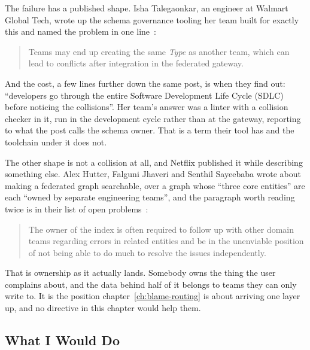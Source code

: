 %
The failure has a published shape. Isha Talegaonkar, an engineer at Walmart
Global Tech, wrote up the schema governance tooling her team built for exactly
this and named the problem in one line~\autocite{talegaonkar2022governance}:

\begin{quote}
Teams may end up creating the same \emph{Type} as another team, which can lead
to conflicts after integration in the federated gateway.
\end{quote}

%
And the cost, a few lines further down the same post, is when they find out:
\enquote{developers go through the entire Software Development Life Cycle
(SDLC) before noticing the collisions}. Her team's answer was a linter with a
collision checker in it, run in the development cycle rather than at the
gateway, reporting to what the post calls the schema owner. That is a term
their tool has and the toolchain under it does not.

%
The other shape is not a collision at all, and Netflix published it while
describing something else. Alex Hutter, Falguni Jhaveri and Senthil Sayeebaba
wrote about making a federated graph searchable, over a graph whose \enquote{three
core entities} are each \enquote{owned by separate engineering teams}, and the
paragraph worth reading twice is in their list of open
problems~\autocite{hutter2022search}:

\begin{quote}
The owner of the index is often required to follow up with other domain teams
regarding errors in related entities and be in the unenviable position of not
being able to do much to resolve the issues independently.
\end{quote}

%
That is ownership as it actually lands. Somebody owns the thing the user
complains about, and the data behind half of it belongs to teams they can
only write to. It is the position chapter~\ref{ch:blame-routing} is about
arriving one layer up, and no directive in this chapter would help them.

\subsection{What I Would Do}

